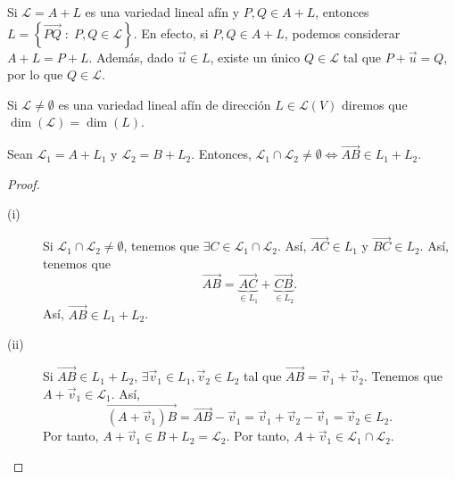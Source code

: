 \begin{observation}
	\normalfont Si $\displaystyle \mathcal{L} = A + L $ es una variedad lineal afín y $\displaystyle P,Q \in A + L $, entonces $\displaystyle L = \left\{ \overrightarrow{PQ} \; : \; P,Q \in \mathcal{L}\right\}  $. En efecto, si $\displaystyle P,Q \in A + L $, podemos considerar $\displaystyle A + L = P + L $. Además, dado $\displaystyle \vec{u} \in L $, existe un único $\displaystyle Q \in \mathcal{L} $ tal que $\displaystyle P + \vec{u} = Q $, por lo que $\displaystyle Q \in \mathcal{L} $.  
\end{observation}
\begin{fdefinition}
\normalfont Si $\displaystyle \mathcal{L} \neq \emptyset $ es una variedad lineal afín de dirección $\displaystyle L \in \mathcal{L}\left(V\right) $ diremos que $\displaystyle \dim\left(\mathcal{L}\right) = \dim\left(L\right) $.
\end{fdefinition}
\begin{ftheorem}[]
	\normalfont Sean $\displaystyle \mathcal{L}_{1} = A + L_{1} $ y $\displaystyle \mathcal{L}_{2} = B + L_{2} $. Entonces, $\displaystyle \mathcal{L}_{1} \cap \mathcal{L}_{2} \neq \emptyset \iff \overrightarrow{AB} \in L_{1} + L_{2}$.
\end{ftheorem}
\begin{proof}
\begin{description}
	\item[(i)] Si $\displaystyle \mathcal{L}_{1} \cap \mathcal{L}_{2} \neq \emptyset $, tenemos que $\displaystyle \exists C \in \mathcal{L}_{1} \cap \mathcal{L}_{2} $. Así, $\displaystyle \overrightarrow{AC} \in L_{1} $ y $\displaystyle \overrightarrow{BC} \in L_{2} $. Así, tenemos que 
		\[\overrightarrow{AB} = \underbrace{\overrightarrow{AC}}_{\in L_{1}} + \underbrace{\overrightarrow{CB}}_{\in L_{2}} .\]
		Así, $\displaystyle \overrightarrow{AB} \in L_{1} + L_{2} $.
	\item[(ii)] Si $\displaystyle \overrightarrow{AB} \in L_{1} + L_{2} $, $\displaystyle \exists \vec{v}_{1} \in L_{1}, \vec{v}_{2} \in L_{2} $ tal que $\displaystyle \overrightarrow{AB} = \vec{v}_{1} +\vec{v}_{2} $. Tenemos que $\displaystyle A + \vec{v}_{1} \in \mathcal{L}_{1} $. Así,
		\[ \overrightarrow{\left(A + \vec{v}_{1}\right)B} = \overrightarrow{AB} - \vec{v}_{1} = \vec{v}_{1} +\vec{v}_{2} -\vec{v}_{1} = \vec{v}_{2} \in L_{2} .\]
		Por tanto, $\displaystyle A + \vec{v}_{1} \in B + L_{2} = \mathcal{L}_{2}$. Por tanto, $\displaystyle A + \vec{v}_{1} \in \mathcal{L}_{1} \cap \mathcal{L}_{2} $.
\end{description}
\end{proof}
